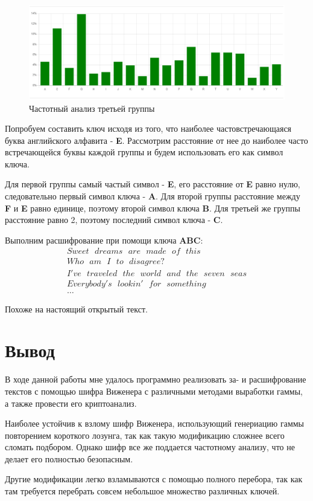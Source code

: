 \documentclass[a4paper]{article}
\begin{document}
  \begin{figure}[H]
    \centering
    \includegraphics[width=\textwidth]{03_0006}
    \caption{Частотный анализ третьей группы}
  \end{figure}

  Попробуем составить ключ исходя из того, что наиболее частовстречающаяся буква английского алфавита - \textbf{E}.
  Рассмотрим расстояние от нее до наиболее часто встречающейся буквы каждой группы и будем
  использовать его как символ ключа.

  Для первой группы самый частый символ - \textbf{E}, его расстояние от \textbf{E} равно нулю,
  следовательно первый символ ключа - \textbf{A}.
  Для второй группы расстояние между \textbf{F} и \textbf{E} равно единице, поэтому второй символ ключа
  \textbf{B}. Для третьей же группы расстояние равно 2, поэтому последний символ ключа - \textbf{C}.

  Выполним расшифрование при помощи ключа \textbf{ABC}:
  \begin{equation}
    \begin{aligned}
      Sweet \text{ } dreams \text{ } are \text{ } made \text{ } of \text{ } this \\
      Who \text{ } am \text{ } I \text{ } to \text{ } disagree? \\
      I've \text{ } traveled \text{ } the \text{ } world \text{ } and \text{ } the \text{ } seven \text{ } seas \\
      Everybody's \text{ } lookin' \text{ } for \text{ } something \\
      \dots
    \end{aligned}
  \end{equation}

  Похоже на настоящий открытый текст.

  \newpage
  \section{Вывод}

  В ходе данной работы мне удалось программно реализовать за- и расшифрование текстов
  с помощью шифра Виженера с различными методами выработки гаммы, а также провести его криптоанализ.

  Наиболее устойчив к взлому шифр Виженера, использующий генериацию гаммы повторением короткого лозунга,
  так как такую модификацию сложнее всего сломать подбором. Однако шифр все же поддается
  частотному анализу, что не делает его полностью безопасным.

  Другие модификации легко взламываются с помощью полного перебора, так как там требуется перебрать
  совсем небольшое множество различных ключей.
\end{document}
